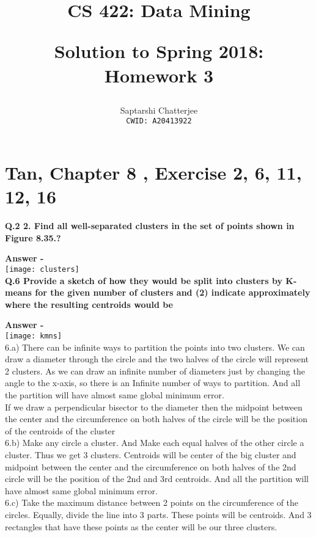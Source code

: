 \documentclass[5pt]{article}
\title{CS 422: Data Mining\\
\begin{large}
Solution to Spring 2018: Homework 3
\end{large}
}
\author{Saptarshi Chatterjee \\
\texttt{CWID: A20413922}
}
\begin{document}
\maketitle

\section{Tan, Chapter 8 , Exercise 2, 6, 11, 12, 16}
\textbf{Q.2 2. Find all well-separated clusters in the set of points shown in Figure 8.35.?}


\setlength{\parskip}{1.2em}
\setlength{\parindent}{0em}

\textbf{Answer -} \\
\texttt{[image: clusters]} \\

\textbf{Q.6  Provide a sketch of how they would be split into clusters by K-means for the given number of clusters and (2) indicate approximately where the resulting centroids would be }

\setlength{\parskip}{1.2em}
\setlength{\parindent}{0em}

\textbf{Answer -} \\

\texttt{[image: kmns]} \\


6.a) There can be infinite ways to partition the points into two clusters.  We can draw a diameter through the circle and the two halves of the circle will represent 2 clusters. As we can draw an infinite number of diameters just by changing the angle to the x-axis, so there is an Infinite number of ways to partition. And all the partition will have almost same global minimum error.\\

If we draw a perpendicular bisector to the diameter then the midpoint between the center and the circumference on both halves of the circle will be the position of the centroids of the cluster\\

6.b) Make any circle a cluster. And  Make each equal halves of the other circle a cluster. Thus we get 3 clusters. Centroids will be center of the big cluster and midpoint between the center and the circumference on both halves of the 2nd circle will be the position of the 2nd and 3rd centroids.  And all the partition will have almost same global minimum error. \\

6.c) Take the maximum distance between 2 points on the circumference of the circles. Equally, divide the line into 3 parts. These points will be centroids. And 3 rectangles that have these points as the center will be our three clusters.\\
\end{document}
